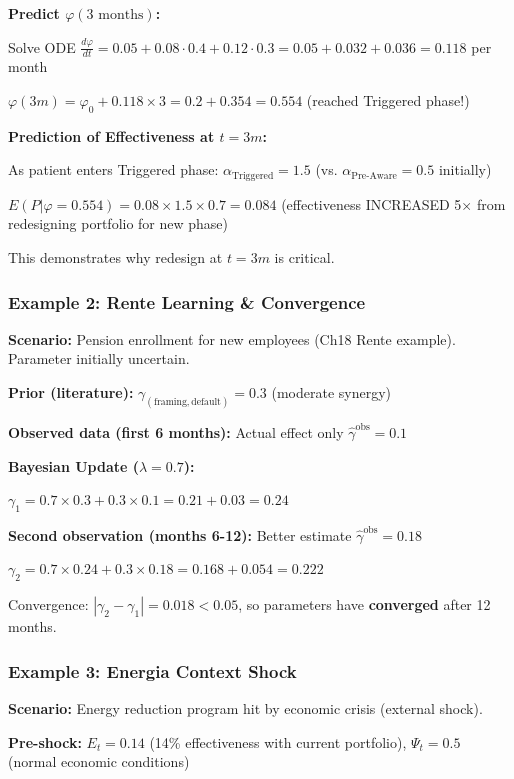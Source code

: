\textbf{Predict $\varphi(3\text{ months})$:}

Solve ODE $\frac{d\varphi}{dt} = 0.05 + 0.08 \cdot 0.4 + 0.12 \cdot 0.3 = 0.05 + 0.032 + 0.036 = 0.118$ per month

$\varphi(3m) = \varphi_0 + 0.118 \times 3 = 0.2 + 0.354 = 0.554$ (reached Triggered phase!)

\textbf{Prediction of Effectiveness at $t=3m$:}

As patient enters Triggered phase: $\alpha_{\text{Triggered}} = 1.5$ (vs. $\alpha_{\text{Pre-Aware}} = 0.5$ initially)

$E(P | \varphi=0.554) = 0.08 \times 1.5 \times 0.7 = 0.084$ (effectiveness INCREASED 5× from redesigning portfolio for new phase)

This demonstrates why redesign at $t=3m$ is critical.

\subsubsection*{Example 2: Rente Learning & Convergence}

\textbf{Scenario:} Pension enrollment for new employees (Ch18 Rente example). Parameter initially uncertain.

\textbf{Prior (literature):} $\gamma_{(\text{framing}, \text{default})} = 0.3$ (moderate synergy)

\textbf{Observed data (first 6 months):} Actual effect only $\hat{\gamma}^{\text{obs}} = 0.1$

\textbf{Bayesian Update ($\lambda = 0.7$):}

$\gamma_1 = 0.7 \times 0.3 + 0.3 \times 0.1 = 0.21 + 0.03 = 0.24$

\textbf{Second observation (months 6-12):} Better estimate $\hat{\gamma}^{\text{obs}} = 0.18$

$\gamma_2 = 0.7 \times 0.24 + 0.3 \times 0.18 = 0.168 + 0.054 = 0.222$

Convergence: $|\gamma_2 - \gamma_1| = 0.018 < 0.05$, so parameters have \textbf{converged} after 12 months.

\subsubsection*{Example 3: Energia Context Shock}

\textbf{Scenario:} Energy reduction program hit by economic crisis (external shock).

\textbf{Pre-shock:} $E_t = 0.14$ (14\% effectiveness with current portfolio), $\Psi_t = 0.5$ (normal economic conditions)

